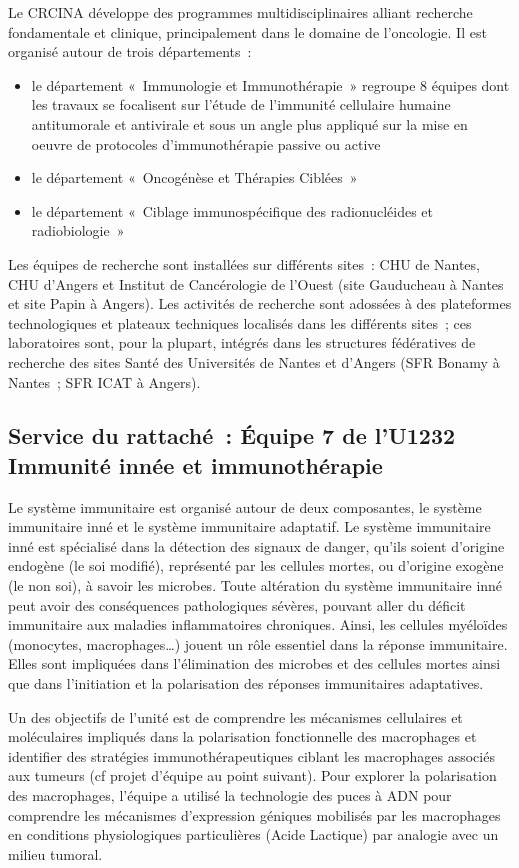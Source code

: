 \documentclass[a4paper,10pt]{article}
\begin{document}
Le CRCINA développe des programmes multidisciplinaires alliant recherche fondamentale et clinique, principalement dans le domaine de l’oncologie. Il est organisé autour de trois départements :
\begin{itemize}
 \item le département « Immunologie et Immunothérapie » regroupe 8 équipes dont les travaux se focalisent sur l’étude de l’immunité cellulaire humaine antitumorale et antivirale et sous un angle plus appliqué sur la mise en oeuvre de protocoles d’immunothérapie passive ou active
\item le département « Oncogénèse et Thérapies Ciblées »
\item le département « Ciblage immunospécifique des radionucléides et radiobiologie » 
\end{itemize}
Les équipes de recherche sont installées sur différents sites : CHU de Nantes, CHU d’Angers et Institut de Cancérologie de l’Ouest (site Gauducheau à Nantes et site Papin à Angers).
Les activités de recherche sont adossées à des plateformes technologiques et plateaux techniques localisés dans les différents sites ; ces laboratoires sont, pour la plupart, intégrés dans les structures fédératives de recherche des sites Santé des Universités de Nantes et d’Angers (SFR Bonamy à Nantes ; SFR ICAT à Angers).
\subsection{Service du rattaché : Équipe 7 de l’U1232 Immunité innée et immunothérapie}
Le système immunitaire est organisé autour de deux composantes, le système immunitaire inné et le système immunitaire adaptatif. Le système immunitaire inné est spécialisé dans la détection des signaux de danger, qu’ils soient d’origine endogène (le soi modifié), représenté par les cellules mortes, ou d’origine exogène (le non soi), à savoir les microbes. 
Toute altération du système immunitaire inné peut avoir des conséquences pathologiques sévères, pouvant aller du déficit immunitaire aux maladies inflammatoires chroniques. Ainsi, les cellules myéloïdes (monocytes, macrophages…) jouent un rôle essentiel dans la réponse immunitaire. Elles sont impliquées dans l’élimination des microbes et des cellules mortes ainsi que dans l’initiation et la polarisation des réponses immunitaires adaptatives. 

Un des objectifs de l’unité est de comprendre les mécanismes cellulaires et moléculaires impliqués dans la polarisation fonctionnelle des macrophages et identifier des stratégies immunothérapeutiques ciblant les macrophages associés aux tumeurs (cf projet d’équipe au point suivant). 
Pour explorer la polarisation des macrophages, l’équipe a utilisé la technologie des puces à ADN pour comprendre les mécanismes d’expression géniques mobilisés par les macrophages en conditions physiologiques particulières (Acide Lactique) par analogie avec un milieu tumoral. 
\end{document}
